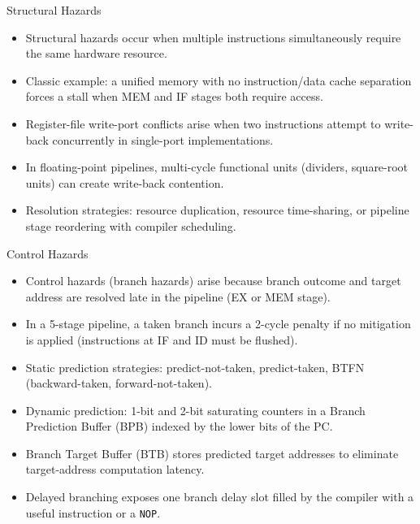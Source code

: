 \documentclass{beamer}
\begin{document}
\begin{frame}{Structural Hazards}
  \begin{itemize}
    \item Structural hazards occur when multiple instructions simultaneously
          require the same hardware resource.
    \item Classic example: a unified memory with no instruction/data cache
          separation forces a stall when MEM and IF stages both require access.
    \item Register-file write-port conflicts arise when two instructions attempt
          to write-back concurrently in single-port implementations.
    \item In floating-point pipelines, multi-cycle functional units (dividers,
          square-root units) can create write-back contention.
    \item Resolution strategies: resource duplication, resource time-sharing,
          or pipeline stage reordering with compiler scheduling.
  \end{itemize}
\end{frame}

\begin{frame}{Control Hazards}
  \begin{itemize}
    \item Control hazards (branch hazards) arise because branch outcome and
          target address are resolved late in the pipeline (EX or MEM stage).
    \item In a 5-stage pipeline, a taken branch incurs a 2-cycle penalty if
          no mitigation is applied (instructions at IF and ID must be flushed).
    \item Static prediction strategies: predict-not-taken, predict-taken,
          BTFN (backward-taken, forward-not-taken).
    \item Dynamic prediction: 1-bit and 2-bit saturating counters in a Branch
          Prediction Buffer (BPB) indexed by the lower bits of the PC.
    \item Branch Target Buffer (BTB) stores predicted target addresses to
          eliminate target-address computation latency.
    \item Delayed branching exposes one branch delay slot filled by the compiler
          with a useful instruction or a \texttt{NOP}.
  \end{itemize}
\end{frame}
\end{document}
